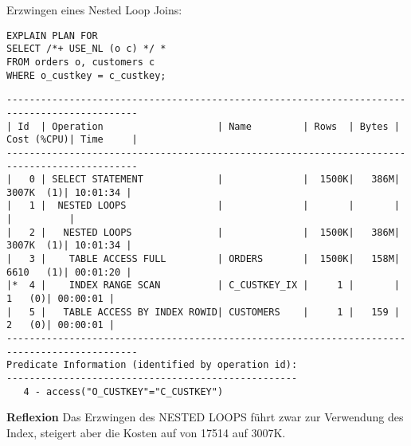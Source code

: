 \documentclass[10pt]{article}
\begin{document}
Erzwingen eines Nested Loop Joins:
\begin{lstlisting}[style=sql]
EXPLAIN PLAN FOR
SELECT /*+ USE_NL (o c) */ *
FROM orders o, customers c
WHERE o_custkey = c_custkey;
\end{lstlisting}
\begin{lstlisting}[style=queryexecutionplan]
---------------------------------------------------------------------------------------------
| Id  | Operation                    | Name         | Rows  | Bytes | Cost (%CPU)| Time     |
---------------------------------------------------------------------------------------------
|   0 | SELECT STATEMENT             |              |  1500K|   386M|  3007K  (1)| 10:01:34 |
|   1 |  NESTED LOOPS                |              |       |       |            |          |
|   2 |   NESTED LOOPS               |              |  1500K|   386M|  3007K  (1)| 10:01:34 |
|   3 |    TABLE ACCESS FULL         | ORDERS       |  1500K|   158M|  6610   (1)| 00:01:20 |
|*  4 |    INDEX RANGE SCAN          | C_CUSTKEY_IX |     1 |       |     1   (0)| 00:00:01 |
|   5 |   TABLE ACCESS BY INDEX ROWID| CUSTOMERS    |     1 |   159 |     2   (0)| 00:00:01 |
---------------------------------------------------------------------------------------------
Predicate Information (identified by operation id):
---------------------------------------------------
   4 - access("O_CUSTKEY"="C_CUSTKEY")
\end{lstlisting}
\textbf{Reflexion} \newline
Das Erzwingen des NESTED LOOPS führt zwar zur Verwendung des Index, steigert aber die Kosten auf von 17514 auf 3007K.
\end{document}
